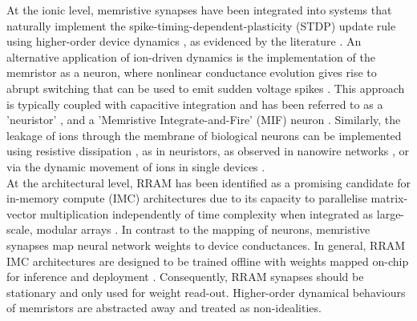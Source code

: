 \noindent At the ionic level, memristive synapses have been integrated into systems that naturally implement the spike-timing-dependent-plasticity (STDP) update rule using higher-order device dynamics \cite{serrano2013stdp}, as evidenced by the literature \cite{lin2020adaptive}. An alternative application of ion-driven dynamics is the implementation of the memristor as a neuron, where nonlinear conductance evolution gives rise to abrupt switching that can be used to emit sudden voltage spikes \cite{lim2015reliability}. This approach \cite{bao2019dual} is typically coupled with capacitive integration and has been referred to as a 'neuristor' \cite{del2020caloritronics}, and a 'Memristive Integrate-and-Fire' (MIF) neuron \cite{hao2020monolayer,kang2021build,zhou2022fully}. Similarly, the leakage of ions through the membrane of biological neurons can be implemented using resistive dissipation \cite{loeffler2021modularity}, as in neuristors, as observed in nanowire networks \cite{hochstetter2021avalanches,zhu2021mnist}, or via the dynamic movement of ions in single devices \cite{zhu2020memristor}. \\





\noindent At the architectural level, RRAM has been identified as a promising candidate for in-memory compute (IMC) architectures \cite{li2018analog} due to its capacity to parallelise matrix-vector multiplication independently of time complexity when integrated as large-scale, modular arrays \cite{eshraghian20213}. In contrast to the mapping of neurons, memristive synapses map neural network weights to device conductances. In general, RRAM IMC architectures are designed to be trained offline with weights mapped on-chip for inference and deployment \cite{zhang2020brain}. Consequently, RRAM synapses should be stationary and only used for weight read-out. Higher-order dynamical behaviours of memristors are abstracted away and treated as non-idealities. \\

